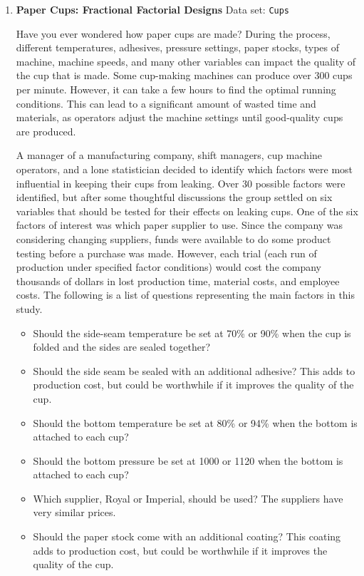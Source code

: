 \documentclass[
]{report}
\begin{document}
\begin{enumerate}
  \item \textbf{Paper Cups: Fractional Factorial Designs}
  Data set: \texttt{Cups}

Have you ever wondered how paper cups are made? During the process, different temperatures, adhesives, pressure settings, paper stocks, types of machine, machine speeds, and many other variables can impact the quality of the cup that is made. Some cup-making machines can produce over 300 cups per minute. However, it can take a few hours to find the optimal running conditions. This can lead to a significant amount of wasted time and materials, as operators adjust the machine settings until good-quality cups are produced.

A manager of a manufacturing company, shift managers, cup machine operators, and a lone statistician decided to identify which factors were most influential in keeping their cups from leaking. Over 30 possible factors were identified, but after some thoughtful discussions the group settled on six variables that should be tested for their effects on leaking cups. One of the six factors of interest was which paper supplier to use. Since the company was considering changing suppliers, funds were available to do some product testing before a purchase was made. However, each trial (each run of production under specified factor conditions) would cost the company thousands of dollars in lost production time, material costs, and employee costs. The following is a list of questions representing the main factors in this study.

  \begin{itemize}
    \item Should the side-seam temperature be set at 70\% or 90\% when the cup is folded and the sides are sealed together?
    \item Should the side seam be sealed with an additional adhesive? This adds to production cost, but could be worthwhile if it improves the quality of the cup.
    \item Should the bottom temperature be set at 80\% or 94\% when the bottom is attached to each cup?
    \item Should the bottom pressure be set at 1000 or 1120 when the bottom is attached to each cup?
    \item Which supplier, Royal or Imperial, should be used? The suppliers have very similar prices.
    \item Should the paper stock come with an additional coating? This coating adds to production cost, but could be worthwhile if it improves the quality of the cup.
    \end{itemize}


\end{enumerate}
\end{document}
